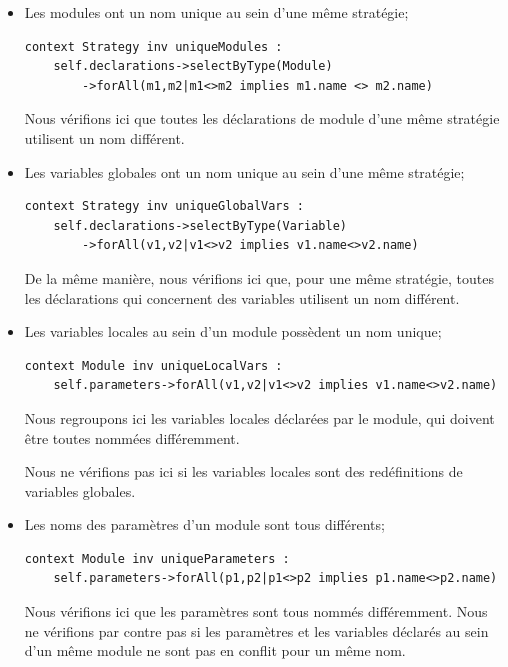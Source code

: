 \documentclass[oneside,a4paper]{book}
\begin{document}
\begin{itemize}
    \item Les modules ont un nom unique au sein d'une même stratégie;
    \begin{lstlisting}
context Strategy inv uniqueModules : 
    self.declarations->selectByType(Module)
        ->forAll(m1,m2|m1<>m2 implies m1.name <> m2.name)
    \end{lstlisting}
    Nous vérifions ici que toutes les déclarations de module d'une même stratégie utilisent un nom différent.

    \item Les variables globales ont un nom unique au sein d'une même stratégie;
    \begin{lstlisting}
context Strategy inv uniqueGlobalVars : 
    self.declarations->selectByType(Variable)
        ->forAll(v1,v2|v1<>v2 implies v1.name<>v2.name)
    \end{lstlisting}
    
    De la même manière, nous vérifions ici que, pour une même stratégie, toutes les déclarations qui concernent des variables utilisent un nom différent.

    \item Les variables locales au sein d'un module possèdent un nom unique;
    \begin{lstlisting}
context Module inv uniqueLocalVars : 
    self.parameters->forAll(v1,v2|v1<>v2 implies v1.name<>v2.name)
    \end{lstlisting}
    
    Nous regroupons ici les variables locales déclarées par le module, qui doivent être toutes nommées différemment.
    \begin{tcolorbox}
        Nous ne vérifions pas ici si les variables locales sont des redéfinitions de variables globales.
    \end{tcolorbox}

    \item Les noms des paramètres d'un module sont tous différents;
    \begin{lstlisting}
context Module inv uniqueParameters : 
    self.parameters->forAll(p1,p2|p1<>p2 implies p1.name<>p2.name)
    \end{lstlisting}
    
    Nous vérifions ici que les paramètres sont tous nommés différemment. Nous ne vérifions par contre pas si les paramètres et les variables déclarés au sein d'un même module ne sont pas en conflit pour un même nom. 


\end{itemize}
\end{document}
